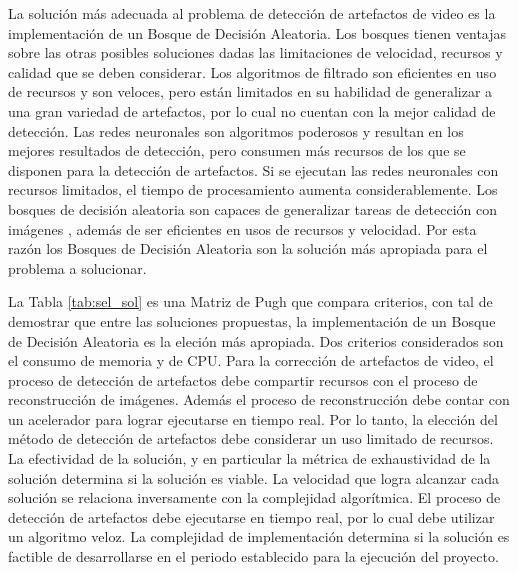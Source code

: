 La solución más adecuada al problema de detección de artefactos de video es la implementación de un Bosque de Decisión Aleatoria. Los bosques tienen ventajas sobre las otras posibles soluciones dadas las limitaciones de velocidad, recursos y calidad que se deben considerar. Los algoritmos de filtrado son eficientes en uso de recursos y son veloces, pero están limitados en su habilidad de generalizar a una gran variedad de artefactos, por lo cual no cuentan con la mejor calidad de detección. Las redes neuronales son algoritmos poderosos y resultan en los mejores resultados de detección, pero consumen más recursos de los que se disponen para la detección de artefactos. Si se ejecutan las redes neuronales con recursos limitados, el tiempo de procesamiento aumenta considerablemente. Los bosques de decisión aleatoria son capaces de generalizar tareas de detección con imágenes \cite{Keskin2012}, además de ser eficientes en usos de recursos y velocidad. Por esta razón los Bosques de Decisión Aleatoria son la solución más apropiada para el problema a solucionar.

La Tabla \ref{tab:sel_sol} es una Matriz de Pugh que compara criterios, con tal de demostrar que entre las soluciones propuestas, la implementación de un Bosque de Decisión Aleatoria es la eleción más apropiada. Dos criterios considerados son el consumo de memoria y de CPU. Para la corrección de artefactos de video, el proceso de detección de artefactos debe compartir recursos con el proceso de reconstrucción de imágenes. Además el proceso de reconstrucción debe contar con un acelerador para lograr ejecutarse en tiempo real. Por lo tanto, la elección del método de detección de artefactos debe considerar un uso limitado de recursos. La efectividad de la solución, y en particular la métrica de exhaustividad de la solución determina si la solución es viable. La velocidad que logra alcanzar cada solución se relaciona inversamente con la complejidad algorítmica. El proceso de detección de artefactos debe ejecutarse en tiempo real, por lo cual debe utilizar un algoritmo veloz. La complejidad de implementación determina si la solución es factible de desarrollarse en el periodo establecido para la ejecución del proyecto.

